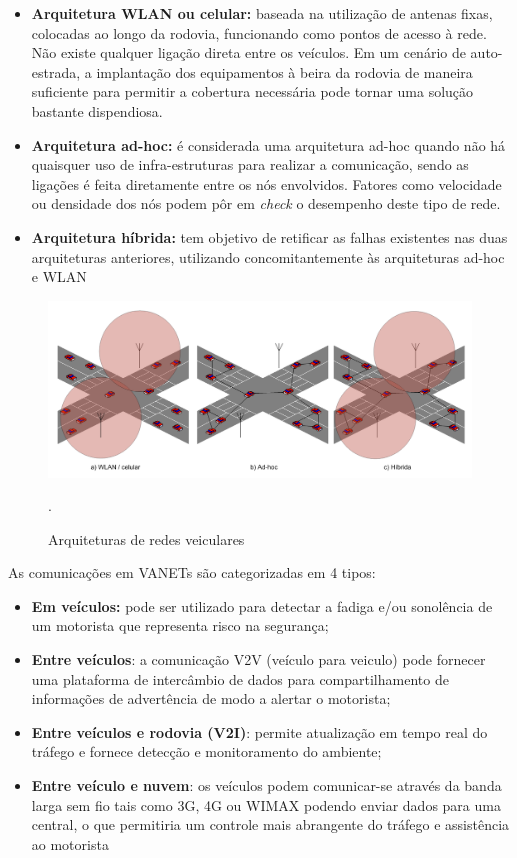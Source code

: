 \documentclass[
	12pt,				%
	oneside,			%
	a4paper,			%
	english,			%
	brazil				%
	]{abntex2ppgsi}
\begin{document}
\begin{itemize}
	\item{\textbf{Arquitetura WLAN ou celular:} baseada na utilização de antenas fixas, colocadas ao longo da rodovia, funcionando como pontos de acesso à rede. Não existe qualquer ligação direta entre os veículos. Em um cenário de auto-estrada, a implantação dos equipamentos à beira da rodovia de maneira suficiente para permitir a cobertura necessária pode tornar uma solução bastante dispendiosa.}	
	\item{\textbf{Arquitetura ad-hoc:} é considerada uma arquitetura ad-hoc quando não há quaisquer uso de infra-estruturas para realizar a comunicação, sendo as ligações é feita diretamente entre os nós envolvidos. Fatores como velocidade ou densidade dos nós podem pôr em \textit{check} o desempenho deste tipo de rede.}	
	\item{\textbf{Arquitetura híbrida: } tem objetivo de retificar as falhas existentes nas duas arquiteturas anteriores, utilizando concomitantemente às arquiteturas ad-hoc e WLAN}	
\end{itemize} 


\begin{figure}[h!]
	\centering
	\includegraphics[width=0.8\columnwidth]{images/tipos_arquiteturas_vanets}
	\caption{Arquiteturas de redes veiculares\cite{luis2009melhoria}}.
	\label{fig:arquiteturas_vanets}
\end{figure}


As comunicações em VANETs são categorizadas em 4 tipos:
\begin{itemize}
	\item {\textbf{Em veículos:} pode ser utilizado para detectar a fadiga e/ou sonolência de um motorista que representa  risco na segurança;}
	\item {\textbf{Entre veículos}: a comunicação V2V (veículo para veiculo) pode fornecer uma plataforma de intercâmbio de dados para compartilhamento de informações de advertência de modo a alertar o motorista;}
	\item {\textbf{Entre veículos e rodovia (V2I)}: permite atualização em tempo real do tráfego e fornece detecção e monitoramento do ambiente;}
	\item {\textbf{Entre veículo e nuvem}: os veículos podem comunicar-se através da banda larga sem fio tais como 3G, 4G ou WIMAX podendo enviar dados para uma central, o que permitiria um controle mais abrangente do tráfego e assistência ao motorista}
\end{itemize}
\end{document}
